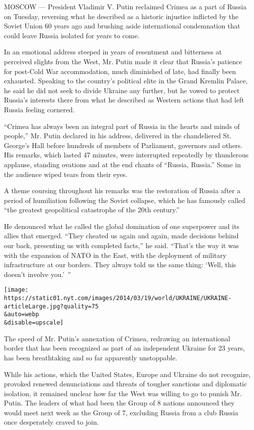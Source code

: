 MOSCOW --- President Vladimir V. Putin reclaimed Crimea as a part of
Russia on Tuesday, reversing what he described as a historic injustice
inflicted by the Soviet Union 60 years ago and brushing aside
international condemnation that could leave Russia isolated for years to
come.

In an emotional address steeped in years of resentment and bitterness at
perceived slights from the West, Mr. Putin made it clear that Russia's
patience for post-Cold War accommodation, much diminished of late, had
finally been exhausted. Speaking to the country's political elite in the
Grand Kremlin Palace, he said he did not seek to divide Ukraine any
further, but he vowed to protect Russia's interests there from what he
described as Western actions that had left Russia feeling cornered.

``Crimea has always been an integral part of Russia in the hearts and
minds of people,'' Mr. Putin declared in his address, delivered in the
chandeliered St. George's Hall before hundreds of members of Parliament,
governors and others. His remarks, which lasted 47 minutes, were
interrupted repeatedly by thunderous applause, standing ovations and at
the end chants of ``Russia, Russia.'' Some in the audience wiped tears
from their eyes.

A theme coursing throughout his remarks was the restoration of Russia
after a period of humiliation following the Soviet collapse, which he
has famously called ``the greatest geopolitical catastrophe of the 20th
century.''

He denounced what he called the global domination of one superpower and
its allies that emerged. ``They cheated us again and again, made
decisions behind our back, presenting us with completed facts,'' he
said. ``That's the way it was with the expansion of NATO in the East,
with the deployment of military infrastructure at our borders. They
always told us the same thing: `Well, this doesn't involve you.'~''

\texttt{[image: https://static01.nyt.com/images/2014/03/19/world/UKRAINE/UKRAINE-articleLarge.jpg?quality=75\\\&auto=webp\\\&disable=upscale]}

The speed of Mr. Putin's annexation of Crimea, redrawing an
international border that has been recognized as part of an independent
Ukraine for 23 years, has been breathtaking and so far apparently
unstoppable.

While his actions, which the United States, Europe and Ukraine do not
recognize, provoked renewed denunciations and threats of tougher
sanctions and diplomatic isolation, it remained unclear how far the West
was willing to go to punish Mr. Putin. The leaders of what had been the
Group of 8 nations announced they would meet next week as the Group of
7, excluding Russia from a club Russia once desperately craved to join.

